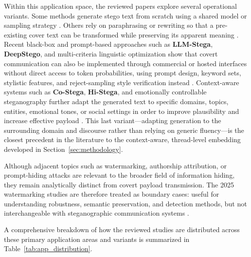 Within this application space, the reviewed papers explore several operational variants. Some methods generate stego text from scratch using a shared model or sampling strategy \cite{ding2023discop,kaptchuk2021meteor}. Others rely on paraphrasing or rewriting so that a pre-existing cover text can be transformed while preserving its apparent meaning \cite{li2023rewriting}. Recent black-box and prompt-based approaches such as \textbf{LLM-Stega}, \textbf{DeepStego}, and multi-criteria linguistic optimization show that covert communication can also be implemented through commercial or hosted interfaces without direct access to token probabilities, using prompt design, keyword sets, stylistic features, and reject-sampling style verification instead \cite{wu2024generative,kuznetsov2025deepstego,wozniak2025multicriteria}. Context-aware systems such as \textbf{Co-Stega}, \textbf{Hi-Stega}, and emotionally controllable steganography further adapt the generated text to specific domains, topics, entities, emotional tones, or social settings in order to improve plausibility and increase effective payload \cite{liao2024co,wang2023hi,shi2025emotionally}. This last variant---adapting generation to the surrounding domain and discourse rather than relying on generic fluency---is the closest precedent in the literature to the context-aware, thread-level embedding developed in Section~\ref{sec:methodology}.

Although adjacent topics such as watermarking, authorship attribution, or prompt-hiding attacks are relevant to the broader field of information hiding, they remain analytically distinct from covert payload transmission. The 2025 watermarking studies are therefore treated as boundary cases: useful for understanding robustness, semantic preservation, and detection methods, but not interchangeable with steganographic communication systems \cite{wang2025contrastive}.

A comprehensive breakdown of how the reviewed studies are distributed across these primary application areas and variants is summarized in Table~\ref{tab:app_distribution}.

